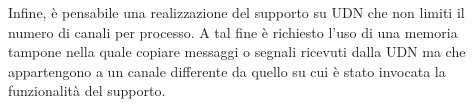 Infine, \`e pensabile una realizzazione del supporto su UDN che non limiti il numero di canali per processo. A tal fine \`e richiesto l'uso di una memoria tampone nella quale copiare messaggi o segnali ricevuti dalla UDN ma che appartengono a un canale differente da quello su cui \`e stato invocata la funzionalit\`a del supporto.


